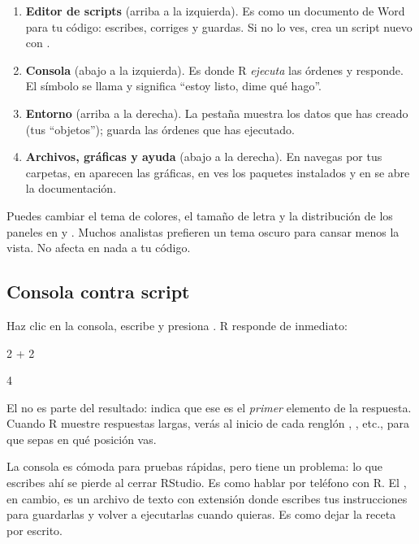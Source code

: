 \begin{enumerate}
  \item \textbf{Editor de scripts} (arriba a la izquierda). Es como un
        documento de Word para tu código: escribes, corriges y guardas. Si
        no lo ves, crea un script nuevo con .
  \item \textbf{Consola} (abajo a la izquierda). Es donde R \emph{ejecuta}
        las órdenes y responde. El símbolo \codigo{>} se llama
         y significa ``estoy listo, dime qué hago''.
  \item \textbf{Entorno} (arriba a la derecha). La pestaña
         muestra los datos que has creado (tus
        ``objetos'');  guarda las órdenes que has ejecutado.
  \item \textbf{Archivos, gráficas y ayuda} (abajo a la derecha). En
         navegas por tus carpetas, en  aparecen las
        gráficas, en  ves los paquetes instalados y en
         se abre la documentación.
\end{enumerate}

\begin{consejo}
Puedes cambiar el tema de colores, el tamaño de letra y la distribución de
los paneles en  y
. Muchos analistas prefieren un tema oscuro para cansar
menos la vista. No afecta en nada a tu código.
\end{consejo}

\subsection{Consola contra script}

Haz clic en la consola, escribe  y presiona .
R responde de inmediato:

\begin{rcode}
2 + 2
\end{rcode}
\begin{rsalida}
[1] 4
\end{rsalida}

El \codigo{[1]} no es parte del resultado: indica que ese es el
\emph{primer} elemento de la respuesta. Cuando R muestre respuestas largas,
verás al inicio de cada renglón \codigo{[1]}, \codigo{[13]}, etc., para que
sepas en qué posición vas.

La consola es cómoda para pruebas rápidas, pero tiene un problema: lo que
escribes ahí se pierde al cerrar RStudio. Es como hablar por teléfono con R.
El , en cambio, es un archivo de texto con extensión
 donde escribes tus instrucciones para guardarlas y volver a
ejecutarlas cuando quieras. Es como dejar la receta por escrito.

